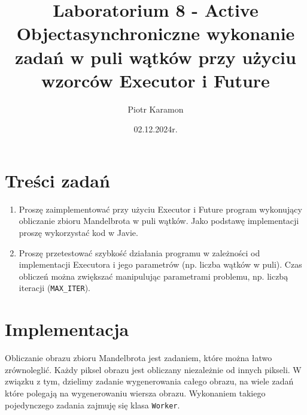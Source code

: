\documentclass[11pt]{article}
\author{Piotr Karamon}
\date{02.12.2024r.}
\title{Laboratorium 8 - Active Objectasynchroniczne wykonanie zadań w puli wątków przy użyciu wzorców Executor i Future}
\begin{document}
\maketitle
\section*{Treści zadań}
\label{sec:orga4b7b53}
\begin{enumerate}
\item Proszę zaimplementować przy użyciu Executor i Future program wykonujący
obliczanie zbioru Mandelbrota w puli wątków. Jako podstawę implementacji
proszę wykorzystać kod w Javie.
\item Proszę przetestować szybkość działania programu w zależności od implementacji
Executora i jego parametrów (np. liczba wątków w puli). Czas obliczeń można
zwiększać manipulując parametrami problemu, np. liczbą iteracji (\texttt{MAX\_ITER}).
\end{enumerate}
\section*{Implementacja}
\label{sec:org09e6651}

Obliczanie obrazu zbioru Mandelbrota jest zadaniem, które można łatwo zrównoleglić.
Każdy piksel obrazu jest obliczany niezależnie od innych pikseli. W związku z tym,
dzielimy zadanie wygenerowania całego obrazu, na wiele zadań które polegają
na wygenerowaniu wiersza obrazu. Wykonaniem takiego pojedynczego zadania
zajmuję się klasa \texttt{Worker}.
\end{document}
